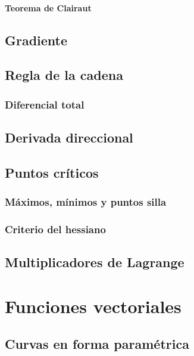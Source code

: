 \documentclass[12pt, fleqn]{report}                             %
\begin{document}
                \subsubsection{Teorema de Clairaut}
                
        \section{Gradiente}
                
        \section{Regla de la cadena}
        
            \subsection{Diferencial total}
            
        \section{Derivada direccional}
        
        \section{Puntos críticos}
        
            \subsection{Máximos, mínimos y puntos silla}
            
            \subsection{Criterio del hessiano}
            
        \section{Multiplicadores de Lagrange}


    \chapter{Funciones vectoriales}
    
        \section{Curvas en forma paramétrica}
        
\end{document}
